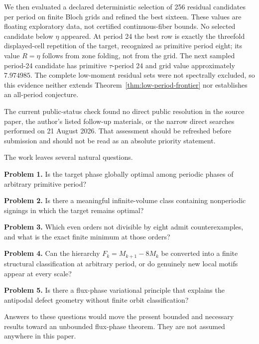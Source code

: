 We then evaluated a declared deterministic selection of 256 residual candidates
per period on finite Bloch grids and refined the best sixteen. These values are
floating exploratory data, not certified continuous-fiber bounds. No selected
candidate below \(\eta\) appeared. At period 24 the best row is exactly the
threefold displayed-cell repetition of the target, recognized as primitive
period eight; its value \(R=\eta\) follows from zone folding, not from the grid.
The next sampled period-24 candidate has primitive \(\tau\)-period 24 and grid
value approximately \(7.974985\). The complete low-moment residual sets were
not spectrally excluded, so this evidence neither extends
Theorem~\ref{thm:low-period-frontier} nor establishes an all-period conjecture.

The current public-status check found no direct public resolution in the
source paper, the author's listed follow-up materials, or the narrow direct
searches performed on 21 August 2026. That assessment should be refreshed
before submission and should not be read as an absolute priority statement.

The work leaves several natural questions.

\textbf{Problem 1.} Is the target phase globally optimal among periodic phases of
arbitrary primitive period?

\textbf{Problem 2.} Is there a meaningful infinite-volume class containing
nonperiodic signings in which the target remains optimal?

\textbf{Problem 3.} Which even orders not divisible by eight admit counterexamples,
and what is the exact finite minimum at those orders?

\textbf{Problem 4.} Can the hierarchy \(F_k=M_{k+1}-8M_k\) be converted into a finite
structural classification at arbitrary period, or do genuinely new local
motifs appear at every scale?

\textbf{Problem 5.} Is there a flux-phase variational principle that explains the
antipodal defect geometry without finite orbit classification?

Answers to these questions would move the present bounded and necessary
results toward an unbounded flux-phase theorem. They are not assumed anywhere
in this paper.
